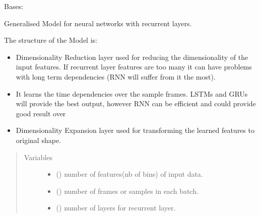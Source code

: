 \documentclass[letterpaper,10pt,english,openany,oneside]{sphinxmanual}
\begin{document}
\begin{fulllineitems}
\label{\detokenize{docs/source/train:train.model.Generalised_Recurrent_Model}}
Bases: 

Generalised Model for neural networks with recurrent layers.

The structure of the Model is:
\begin{itemize}
\item {} 
 Dimensionality Reduction layer used for reducing the dimensionality of the input features. If recurrent layer features are too many it can have problems with long term dependencies (RNN will suffer from it the most).

\item {} 
 It learns the time dependencies over the sample frames. LSTMs and GRUs will provide the best output, however RNN can be efficient and could provide good result over

\item {} 
 Dimensionality Expansion layer used for transforming the learned features to original shape.

\end{itemize}
\begin{quote}\begin{description}
\item[{Variables}] \leavevmode\begin{itemize}
\item {} 
 () \textendash{} number of features(nb of bins) of input data.

\item {} 
 () \textendash{} number of frames or samples in each batch.

\item {} 
 () \textendash{} number of layers for recurrent layer.


\end{itemize}
\end{description}
\end{quote}
\end{fulllineitems}
\end{document}
